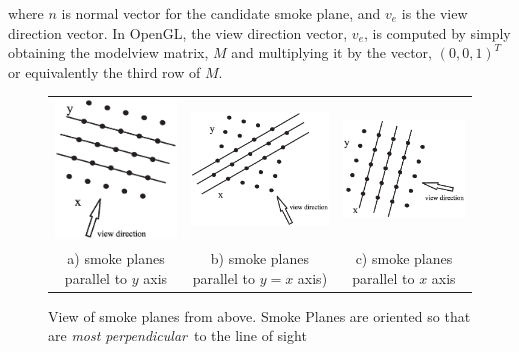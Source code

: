 \documentclass[11pt,twoside]{book}
\begin{document}
\noindent where $n$ is normal vector for the candidate smoke plane, and $v_e$ is
the view direction vector.  In OpenGL, the view direction vector,
$v_e$, is computed by simply obtaining the modelview matrix, $M$
and multiplying it by the vector, $(0,0,1)^T$ or equivalently the
third row of $M$.

\begin{figure}
\begin{tabular}{ccc}
\includegraphics[width=2.0in]{figures/figDIRA2}&
\includegraphics[width=2.0in]{figures/figDIRA3}&
\includegraphics[width=2.0in]{figures/figDIRA1}\\
a) smoke planes parallel to $y$ axis& b) smoke planes parallel to
$y=x$ axis)&
c) smoke planes parallel to $x$ axis\\
\end{tabular}
\caption{View of smoke planes from above.  Smoke Planes are
oriented so that are {\em most perpendicular}\ to the line of sight }
\label{figDIRA}
\end{figure}
\end{document}
